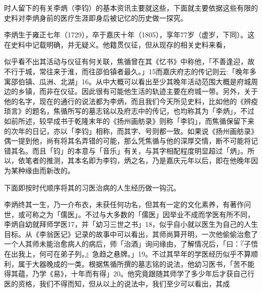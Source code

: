 时人留下的有关李炳（李钧）的基本资讯主要就这些，下面就主要依据这些有限的史料对李炳身前的医疗生涯即身后被记忆的历史做一探究。


李炳生于雍正七年（1729），卒于嘉庆十年（1805），享年77岁（虚岁，下同）。这在史料中记载明确，并无疑义。他籍贯仪征，但从现存的相关史料来看，

\vfill
\begin{BookNotes}
\end{BookNotes}

\noindent 似乎看不出其活动与仪征有何关联，焦循曾在其《忆书》中称他，「不善逢迎，故不行于城，常往来于淮，而往邵伯镇者最久。」15而嘉庆府志的传记则云:「晚年多寓邵伯镇、瓜洲、北湖」16。从中大概可以看出至少其晚年活动范围大概是府城周边的乡镇，而非在仪征。因此很有可能他生活的轨迹主要在府城一带。另外，关于他的名字，现在的通行的说法都为李炳，而且我们今天所见史料，比如他的《辨疫琐言》的题名，焦循所写的墓志铭以及府志中的传记，也均称其为「李炳」，不过如前所述，较早成书于乾隆末年的《扬州画舫录》则称「李钧」，而焦循保留下来的次年的日记，亦以「李钧」相称，而其字、号则都一致。如果说《扬州画舫录》偶一提到他，尚有将其名弄错的可能，那么凭焦循与他的深厚交情，断不可能将记错其名。而且「钧」的本意与「音乐」有关，与其字相配程度明显超过「炳」。所以，依笔者的推测，其本名即为李钧，炳之名，乃是嘉庆元年以后，即在他晚年因为某种缘由而新改的。

下面即按时代顺序将其的习医治病的人生经历做一钩沉。

李炳终其一生，乃一介布衣，未获任何功名，但其有一定的文化素养，有著作问世，或可称之为「儒医」。不过与大多数的「儒医」因举业不成而学医有所不同，李炳自幼就拜师学医17，并「幼习三世之书」18，似乎自小就以医生为自己的人生目标。从《李翁医记》记录的故事中可以看出，其师尚算开明，一次他偷偷治愈了一个人其师未能治愈病人的病后，师「治酒」询问缘由，了解情况后，「曰：『子悟在出我上，何可在弟子列。』急趋之悬牌。」19。不过其早年的学医经历似乎不算顺利，属于大器晚成的一类。根据焦循所撰的墓志铭的说法，他幼习医书，「苦不能得其蕴，乃学《易》，十年而有得」20。他究竟跟随其师学了多少年后才获自己行医的资格，我们不得而知，但从以上的说法中，我们至少可以看出，其成

